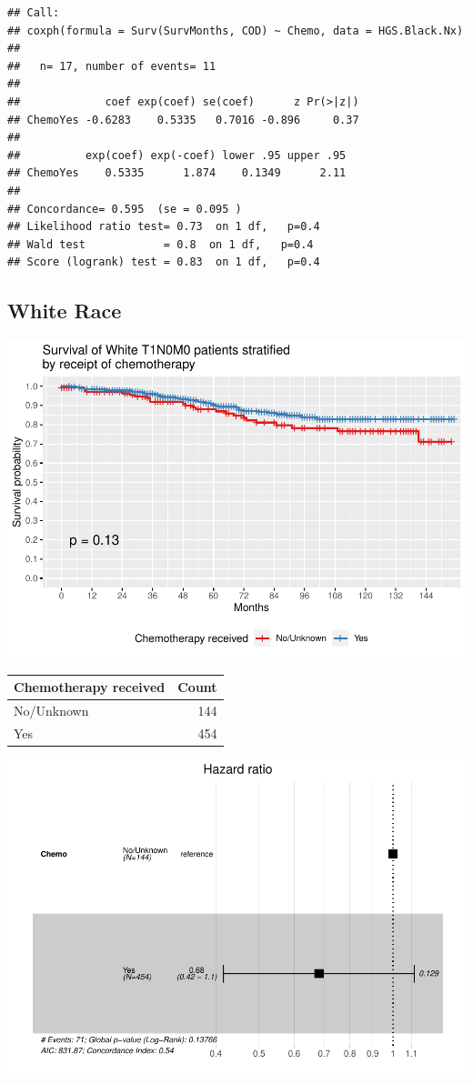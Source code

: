 \documentclass[
]{article}
\begin{document}
\begin{verbatim}
## Call:
## coxph(formula = Surv(SurvMonths, COD) ~ Chemo, data = HGS.Black.Nx)
## 
##   n= 17, number of events= 11 
## 
##             coef exp(coef) se(coef)      z Pr(>|z|)
## ChemoYes -0.6283    0.5335   0.7016 -0.896     0.37
## 
##          exp(coef) exp(-coef) lower .95 upper .95
## ChemoYes    0.5335      1.874    0.1349      2.11
## 
## Concordance= 0.595  (se = 0.095 )
## Likelihood ratio test= 0.73  on 1 df,   p=0.4
## Wald test            = 0.8  on 1 df,   p=0.4
## Score (logrank) test = 0.83  on 1 df,   p=0.4
\end{verbatim}

\hypertarget{white-race-1}{%
\subsection{White Race}\label{white-race-1}}

\includegraphics{EarlyOvaryRace_files/figure-latex/unnamed-chunk-18-1.pdf}

\begin{tabular}[t]{l|r}
\hline
Chemotherapy received & Count\\
\hline
No/Unknown & 144\\
\hline
Yes & 454\\
\hline
\end{tabular}

\includegraphics{EarlyOvaryRace_files/figure-latex/unnamed-chunk-19-1.pdf}
\end{document}
